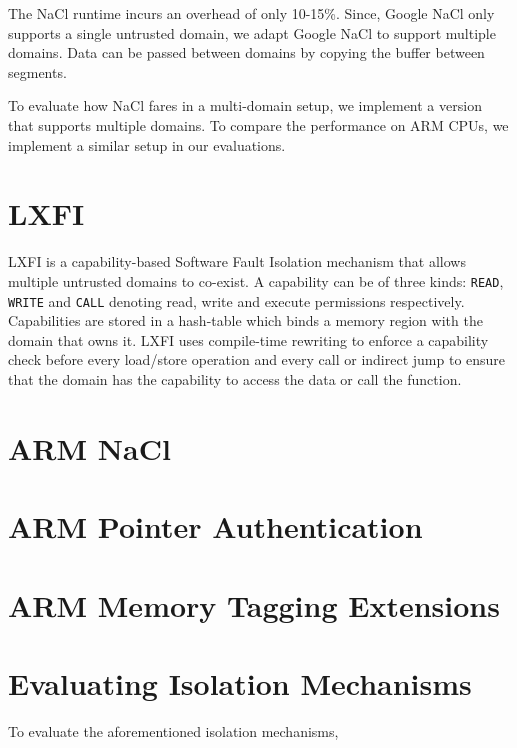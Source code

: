 The NaCl runtime incurs an overhead of only 10-15\%. Since, Google NaCl only supports a single untrusted domain, we adapt Google NaCl to support multiple domains. Data can be passed between domains by copying the buffer between segments. 

To evaluate how NaCl fares in a multi-domain setup, we implement a version that supports multiple domains. To compare the performance on ARM CPUs, we implement a similar setup in our evaluations.

\section{LXFI}
LXFI is a capability-based Software Fault Isolation mechanism that allows multiple untrusted domains to co-exist. A capability can be of three kinds: \lstinline{READ}, \lstinline{WRITE} and \lstinline{CALL} denoting read, write and execute permissions respectively. Capabilities are stored in a hash-table which binds a memory region with the domain that owns it. LXFI uses compile-time rewriting to enforce a capability check before every load/store operation and every call or indirect jump to ensure that the domain has the capability to access the data or call the function. 

\section{ARM NaCl}

\section{ARM Pointer Authentication}

\section{ARM Memory Tagging Extensions}

\section{Evaluating Isolation Mechanisms}
To evaluate the aforementioned isolation mechanisms, 
